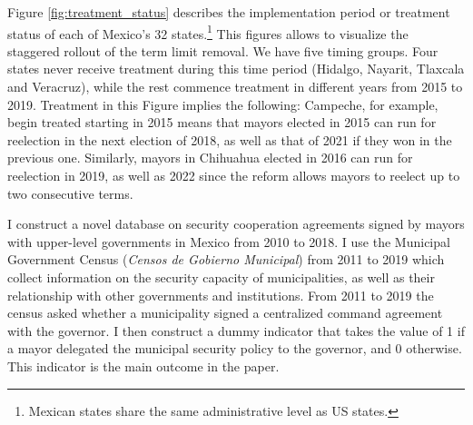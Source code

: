 \documentclass[12pt]{amsart}
\makeatletter
\def\section{\@startsection{section}{1}
	\z@{1.0\linespacing\@plus\linespacing}{.5\linespacing}{\Large}}
\numberwithin{equation}{section}
\theoremstyle{definition}
\theoremstyle{definition}
\theoremstyle{definition}
\makeatother
\begin{document}
Figure \ref{fig:treatment_status} describes the implementation period or treatment status of each of Mexico's 32 states.\footnote{Mexican states share the same administrative level as US states.} This figures allows to visualize the staggered rollout of the term limit removal. We have five timing groups. Four states never receive treatment during this time period (Hidalgo, Nayarit, Tlaxcala and Veracruz), while the rest commence treatment in different years from 2015 to 2019. %
Treatment in this Figure implies the following: Campeche, for example, begin treated starting in 2015 means that mayors elected in 2015 can run for reelection in the next election of 2018, as well as that of 2021 if they won in the previous one. Similarly, mayors in Chihuahua elected in 2016 can run for reelection in 2019, as well as 2022 since the reform allows mayors to reelect up to two consecutive terms.  

\section{Data \label{sec:data}}  

I construct a novel database on security cooperation agreements signed by mayors with upper-level governments in Mexico from 2010 to 2018. I use the Municipal Government Census (\emph{Censos de Gobierno Municipal}) from 2011 to 2019 which collect information on the security capacity of municipalities, as well as their relationship with other governments and institutions. From 2011 to 2019 the census asked whether a municipality signed a centralized command agreement with the governor. I then construct a dummy indicator that takes the value of 1 if a mayor delegated the municipal security policy to the governor, and 0 otherwise. This indicator is the main outcome in the paper. 
\end{document}
